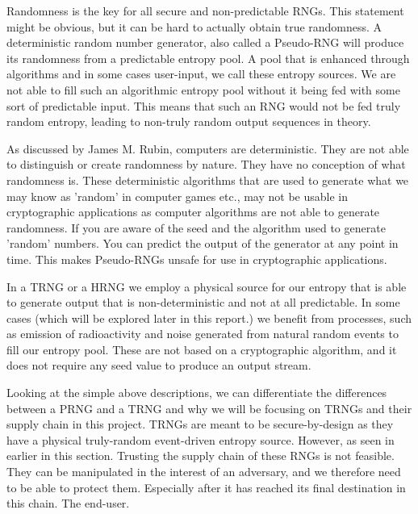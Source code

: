 \documentclass[]{final_report}
\begin{document}
\par{Randomness is the key for all secure and non-predictable RNGs. This statement might be obvious, but it can be hard to actually obtain true randomness. A deterministic random number generator, also called a Pseudo-RNG will produce its randomness from a predictable entropy pool. A pool that is enhanced through algorithms and in some cases user-input, we call these entropy sources. We are not able to fill such an algorithmic entropy pool without it being fed with some sort of predictable input. This means that such an RNG would not be fed truly random entropy, leading to non-truly random output sequences in theory.}

\par{As discussed by James M. Rubin\cite{Rubin:2011}, computers are deterministic. They are not able to distinguish or create randomness by nature. They have no conception of what randomness is. These deterministic algorithms that are used to generate what we may know as 'random' in computer games etc., may not be usable in cryptographic applications as computer algorithms are not able to generate randomness. If you are aware of the seed and the algorithm used to generate 'random' numbers. You can predict the output of the generator at any point in time. This makes Pseudo-RNGs unsafe for use in cryptographic applications.}

\par{In a TRNG or a HRNG we employ a physical source for our entropy that is able to generate output that is non-deterministic and not at all predictable. In some cases (which will be explored later in this report.) we benefit from processes, such as emission of radioactivity and noise generated from natural random events to fill our entropy pool. These are not based on a cryptographic algorithm, and it does not require any seed value to produce an output stream.}

\par{Looking at the simple above descriptions, we can differentiate the differences between a PRNG and a TRNG and why we will be focusing on TRNGs and their supply chain in this project. TRNGs are meant to be secure-by-design as they have a physical truly-random event-driven entropy source. However, as seen in earlier in this section. Trusting the supply chain of these RNGs is not feasible. They can be manipulated in the interest of an adversary, and we therefore need to be able to protect them. Especially after it has reached its final destination in this chain. The end-user.}
\end{document}
